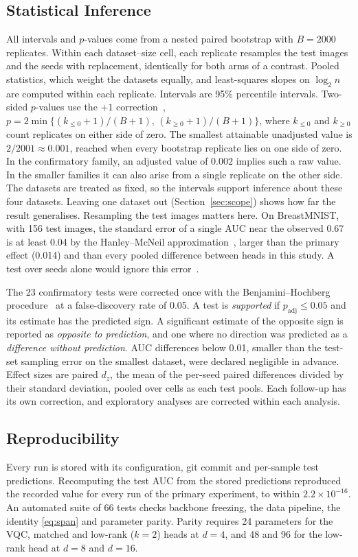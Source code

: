 \documentclass{ieeeaccess}
\newcommand{\vqc}{VQC}
\begin{document}
\subsection{Statistical Inference}
\label{sec:stats}
All intervals and $p$-values come from a nested paired bootstrap with $B=2000$ replicates. Within each dataset--size cell, each replicate resamples the test images and the seeds with replacement, identically for both arms of a contrast. Pooled statistics, which weight the datasets equally, and least-squares slopes on $\log_2 n$ are computed within each replicate. Intervals are 95\% percentile intervals. Two-sided $p$-values use the $+1$ correction~\cite{davison1997}, $p=2\min\{(k_{\le0}+1)/(B+1),\,(k_{\ge0}+1)/(B+1)\}$, where $k_{\le0}$ and $k_{\ge0}$ count replicates on either side of zero. The smallest attainable unadjusted value is $2/2001\approx0.001$, reached when every bootstrap replicate lies on one side of zero. In the confirmatory family, an adjusted value of 0.002 implies such a raw value. In the smaller families it can also arise from a single replicate on the other side. The datasets are treated as fixed, so the intervals support inference about these four datasets. Leaving one dataset out (Section~\ref{sec:scope}) shows how far the result generalises. Resampling the test images matters here. On BreastMNIST, with 156 test images, the standard error of a single AUC near the observed 0.67 is at least 0.04 by the Hanley--McNeil approximation~\cite{hanley1982}, larger than the primary effect (0.014) and than every pooled difference between heads in this study. A test over seeds alone would ignore this error~\cite{bouthillier2021}.

The 23 confirmatory tests were corrected once with the Benjamini--Hochberg procedure~\cite{benjamini1995} at a false-discovery rate of 0.05. A test is \emph{supported} if $p_{\mathrm{adj}}\le0.05$ and its estimate has the predicted sign. A significant estimate of the opposite sign is reported as \emph{opposite to prediction}, and one where no direction was predicted as a \emph{difference without prediction}. AUC differences below 0.01, smaller than the test-set sampling error on the smallest dataset, were declared negligible in advance. Effect sizes are paired $d_z$, the mean of the per-seed paired differences divided by their standard deviation, pooled over cells as each test pools. Each follow-up has its own correction, and exploratory analyses are corrected within each analysis.

\subsection{Reproducibility}
\label{sec:audit}
Every run is stored with its configuration, git commit and per-sample test predictions. Recomputing the test AUC from the stored predictions reproduced the recorded value for every run of the primary experiment, to within $2.2\times10^{-16}$. An automated suite of 66 tests checks backbone freezing, the data pipeline, the identity \eqref{eq:span} and parameter parity. Parity requires 24 parameters for the \vqc{}, matched and low-rank ($k=2$) heads at $d=4$, and 48 and 96 for the low-rank head at $d=8$ and $d=16$.
\end{document}
